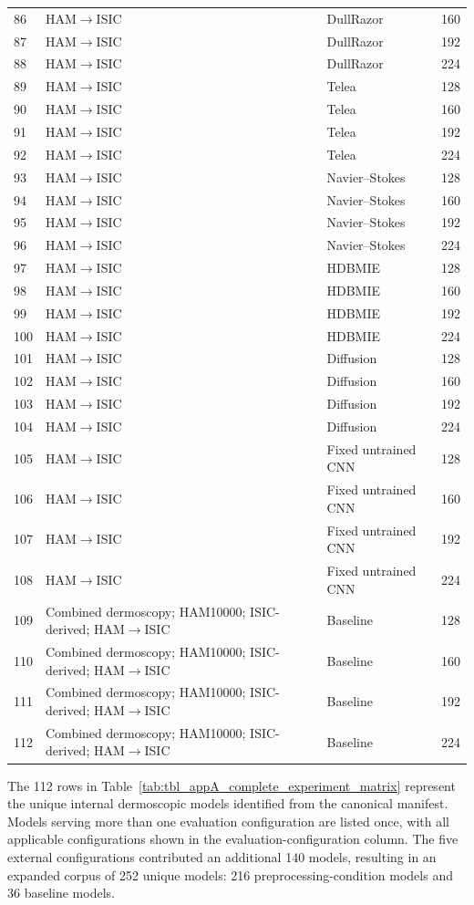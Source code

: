 \begin{longtable}{p{1cm}p{4.2cm}p{4.8cm}p{2cm}}
86 & HAM$\rightarrow$ISIC & DullRazor & 160 \\
87 & HAM$\rightarrow$ISIC & DullRazor & 192 \\
88 & HAM$\rightarrow$ISIC & DullRazor & 224 \\
89 & HAM$\rightarrow$ISIC & Telea & 128 \\
90 & HAM$\rightarrow$ISIC & Telea & 160 \\
91 & HAM$\rightarrow$ISIC & Telea & 192 \\
92 & HAM$\rightarrow$ISIC & Telea & 224 \\
93 & HAM$\rightarrow$ISIC & Navier--Stokes & 128 \\
94 & HAM$\rightarrow$ISIC & Navier--Stokes & 160 \\
95 & HAM$\rightarrow$ISIC & Navier--Stokes & 192 \\
96 & HAM$\rightarrow$ISIC & Navier--Stokes & 224 \\
97 & HAM$\rightarrow$ISIC & HDBMIE & 128 \\
98 & HAM$\rightarrow$ISIC & HDBMIE & 160 \\
99 & HAM$\rightarrow$ISIC & HDBMIE & 192 \\
100 & HAM$\rightarrow$ISIC & HDBMIE & 224 \\
101 & HAM$\rightarrow$ISIC & Diffusion & 128 \\
102 & HAM$\rightarrow$ISIC & Diffusion & 160 \\
103 & HAM$\rightarrow$ISIC & Diffusion & 192 \\
104 & HAM$\rightarrow$ISIC & Diffusion & 224 \\
105 & HAM$\rightarrow$ISIC & Fixed untrained CNN & 128 \\
106 & HAM$\rightarrow$ISIC & Fixed untrained CNN & 160 \\
107 & HAM$\rightarrow$ISIC & Fixed untrained CNN & 192 \\
108 & HAM$\rightarrow$ISIC & Fixed untrained CNN & 224 \\
109 & Combined dermoscopy; HAM10000; ISIC-derived; HAM$\rightarrow$ISIC & Baseline & 128 \\
110 & Combined dermoscopy; HAM10000; ISIC-derived; HAM$\rightarrow$ISIC & Baseline & 160 \\
111 & Combined dermoscopy; HAM10000; ISIC-derived; HAM$\rightarrow$ISIC & Baseline & 192 \\
112 & Combined dermoscopy; HAM10000; ISIC-derived; HAM$\rightarrow$ISIC & Baseline & 224 \\
\end{longtable}

The 112 rows in Table~\ref{tab:tbl_appA_complete_experiment_matrix} represent the unique internal dermoscopic models identified from the canonical manifest. Models serving more than one evaluation configuration are listed once, with all applicable configurations shown in the evaluation-configuration column. The five external configurations contributed an additional 140 models, resulting in an expanded corpus of 252 unique models: 216 preprocessing-condition models and 36 baseline models.
